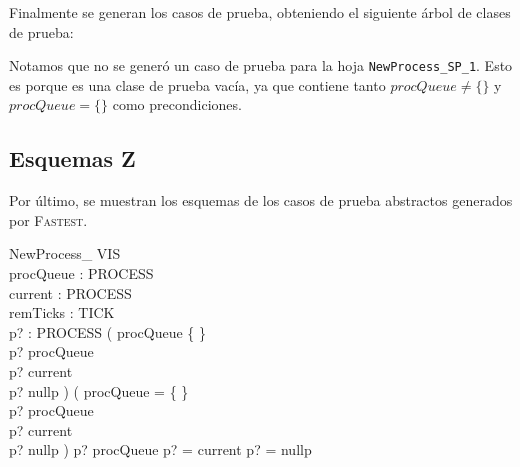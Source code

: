\documentclass{article}
\begin{document}
Finalmente se generan los casos de prueba, obteniendo el siguiente árbol de clases de prueba:

\begin{minipage}{7cm}
\end{minipage}

Notamos que no se generó un caso de prueba para la hoja \verb|NewProcess_SP_1|. Esto es porque es una clase de prueba vacía, ya que contiene tanto $procQueue \neq \{\}$ y $procQueue = \{\}$ como precondiciones.

\subsection*{Esquemas Z}

Por último, se muestran los esquemas de los casos de prueba abstractos generados por \textsc{Fastest}.

\begin{schema}{NewProcess\_ VIS}\\
procQueue : \nat \pinj PROCESS \\
current : PROCESS \\
remTicks : TICK \\
p? : PROCESS 
\where
( procQueue \neq \{ \} \\
p? \notin \ran procQueue \\
p? \neq current \\
p? \neq nullp ) \lor ( procQueue = \{ \} \\
p? \notin \ran procQueue \\
p? \neq current \\
p? \neq nullp ) \lor p? \in \ran procQueue \lor p? = current \lor p? = nullp
\end{schema}
\end{document}
